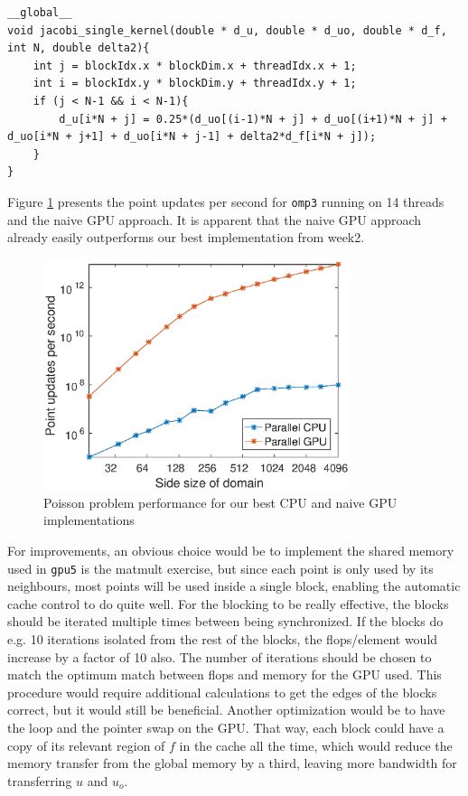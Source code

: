 \begin{lstlisting}
__global__ 
void jacobi_single_kernel(double * d_u, double * d_uo, double * d_f, int N, double delta2){
	int j = blockIdx.x * blockDim.x + threadIdx.x + 1;
	int i = blockIdx.y * blockDim.y + threadIdx.y + 1;
	if (j < N-1 && i < N-1){
		d_u[i*N + j] = 0.25*(d_uo[(i-1)*N + j] + d_uo[(i+1)*N + j] + d_uo[i*N + j+1] + d_uo[i*N + j-1] + delta2*d_f[i*N + j]);
	}
}
\end{lstlisting}

Figure \ref{fig:poisson_sin} presents the point updates per second for \texttt{omp3} running on 14 threads and the naive GPU approach. It is apparent that the naive GPU approach already easily outperforms our best implementation from week2.  


\begin{figure}
\centering
\includegraphics[width = 0.8\textwidth]{fig/gpupar.eps}
\caption{Poisson problem performance for our best CPU and naive GPU implementations}
\label{fig:poisson_sin}
\end{figure}

For improvements, an obvious choice would be to implement the shared memory used in \texttt{gpu5} is the matmult exercise, but since each point is only used by its neighbours, most points will be used inside a single block, enabling the automatic cache control to do quite well. For the blocking to be really effective, the blocks should be iterated multiple times between being synchronized. If the blocks do e.g. 10 iterations isolated from the rest of the blocks, the flops/element would increase by a factor of 10 also. The number of iterations should be chosen to match the optimum match between flops and memory for the GPU used. This procedure would require additional calculations to get the edges of the blocks correct, but it would still be beneficial. Another optimization would be to have the loop and the pointer swap on the GPU. That way, each block could have a copy of its relevant region of $f$ in the cache all the time, which would reduce the memory transfer from the global memory by a third, leaving more bandwidth for transferring $u$ and $u_o$.


